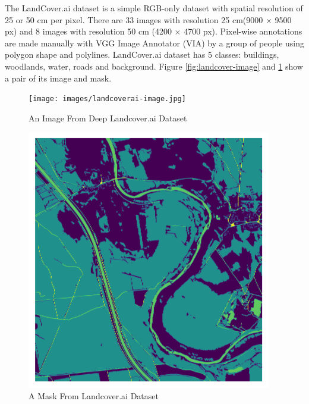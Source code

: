 The LandCover.ai dataset \cite{landcoverai} is a simple RGB-only dataset with spatial resolution of 25 or 50 cm per pixel. There are 33 images with resolution 25 cm(9000 × 9500 px) and 8 images with resolution 50 cm (4200 × 4700 px). Pixel-wise annotations are made manually with VGG Image Annotator (VIA) by a group of people using polygon shape and polylines. LandCover.ai dataset has 5 classes: buildings, woodlands, water, roads and background. Figure \ref{fig:landcover-image} and \ref{fig:landcover-mask} show a pair of its image and mask.

\FloatBarrier
\begin{figure}[!htb]
    \centering
    \begin{minipage}{0.5\textwidth}
        \centering
        \texttt{[image: images/landcoverai-image.jpg]}
        \caption{An Image From Deep Landcover.ai Dataset \protect\cite{landcoverai}}
        \label{fig:landcover-image}
    \end{minipage}\hfill
    \begin{minipage}{0.5\textwidth}
        \centering
        \includegraphics[width=0.95\textwidth, height=0.35\textheight]{images/landcoverai-mask.png}
\centering
\caption{A Mask From Landcover.ai Dataset \protect\cite{landcoverai}}
\label{fig:landcover-mask}
    \end{minipage}
\end{figure}
\FloatBarrier




